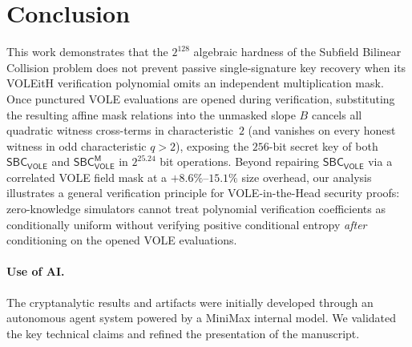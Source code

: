 \documentclass[11pt,a4paper]{article}
\theoremstyle{definition}
\theoremstyle{remark}
\newcommand{\SBCVOLE}{\mathsf{SBC}_{\mathsf{VOLE}}}
\newcommand{\SBCVOLEM}{\mathsf{SBC}_{\mathsf{VOLE}}^{\mathsf{M}}}
\begin{document}
\section{Conclusion}
\label{sec:conclusion}
This work demonstrates that the $2^{128}$ algebraic hardness of the Subfield Bilinear Collision problem does not prevent passive single-signature key recovery when its VOLEitH verification polynomial omits an independent multiplication mask. Once punctured VOLE evaluations are opened during verification, substituting the resulting affine mask relations into the unmasked slope $B$ cancels all quadratic witness cross-terms in characteristic~$2$ (and vanishes on every honest witness in odd characteristic $q > 2$), exposing the $256$-bit secret key of both $\SBCVOLE$ and $\SBCVOLEM$ in $2^{25.24}$ bit operations. Beyond repairing $\SBCVOLE$ via a correlated VOLE field mask at a $+8.6\%$--$15.1\%$ size overhead, our analysis illustrates a general verification principle for VOLE-in-the-Head security proofs: zero-knowledge simulators cannot treat polynomial verification coefficients as conditionally uniform without verifying positive conditional entropy \emph{after} conditioning on the opened VOLE evaluations.

\paragraph{Use of AI.}
The cryptanalytic results and artifacts were initially developed through an autonomous agent system powered by a MiniMax internal model. We validated the key technical claims and refined the presentation of the manuscript.
\end{document}
